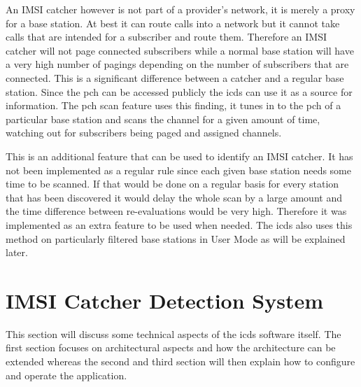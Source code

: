 An IMSI catcher however is not part of a provider's network, it is merely a proxy for a base station.
At best it can route calls into a network but it cannot take calls that are intended for a subscriber and route them.
Therefore an IMSI catcher will not page connected subscribers while a normal base station will have a very high number of pagings depending on the number of subscribers that are connected.
This is a significant difference between a catcher and a regular base station.
Since the \gls{pch} can be accessed publicly the \gls{icds} can use it as a source for information.
The \gls{pch} scan feature uses this finding, it tunes in to the \gls{pch} of a particular base station and scans the channel for a given amount of time, watching out for subscribers being paged and assigned channels.

This is an additional feature that can be used to identify an IMSI catcher.
It has not been implemented as a regular rule since each given base station needs some time to be scanned.
If that would be done on a regular basis for every station that has been discovered it would delay the whole scan by a large amount and the time difference between re-evaluations would be very high.
Therefore it was implemented as an extra feature to be used when needed.
The \gls{icds} also uses this method on particularly filtered base stations in User Mode as will be explained later.


\section{IMSI Catcher Detection System}
\label{sec:icds}
This section will discuss some technical aspects of the \gls{icds} software itself.
The first section focuses on architectural aspects and how the architecture can be extended whereas the second and third section will then explain how to configure and operate the application.

